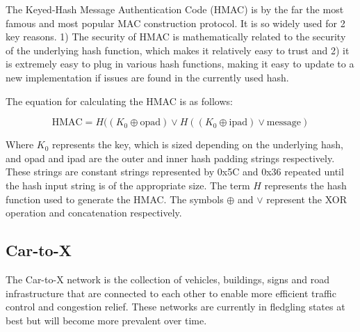 The Keyed-Hash Message Authentication Code (HMAC) is by the far the most famous and most popular MAC construction protocol. It is so widely used for 2 key reasons. 1) The security of HMAC is mathematically related to the security of the underlying hash function, which makes it relatively easy to trust and 2) it is extremely easy to plug in various hash functions, making it easy to update to a new implementation if issues are found in the currently used hash\cite{HMAC}\cite{FIPS-198-1}.

The equation for calculating the HMAC is as follows: 

$$ \text{HMAC} = H((K_0\oplus \text{opad})\vee H((K_0\oplus \text{ipad})\vee \text{message}) $$

Where $K_0$ represents the key, which is sized depending on the underlying hash, and opad and ipad are the outer and inner hash padding strings respectively. These strings are constant strings represented by 0x5C and 0x36 repeated until the hash input string is of the appropriate size. The term $H$ represents the hash function used to generate the HMAC. The symbols $\oplus$ and $\vee$ represent the XOR operation and concatenation respectively. \cite{FIPS-198-1}

\subsection{Car-to-X}
The Car-to-X network is the collection of vehicles, buildings, signs and road infrastructure that are connected to each other to enable more efficient traffic control and congestion relief. These networks are currently in fledgling states at best but will become more prevalent over time.